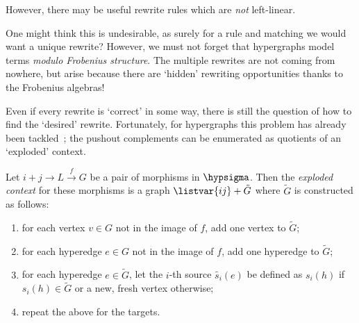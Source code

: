 \begin{example}
\end{example}

However, there may be useful rewrite rules which are \emph{not} left-linear.

\begin{example}
\end{example}

One might think this is undesirable, as surely for a rule and matching we would
want a unique rewrite?
However, we must not forget that hypergraphs model terms
\emph{modulo Frobenius structure}.
The multiple rewrites are not coming from nowhere, but arise because there are
`hidden' rewriting opportunities thanks to the Frobenius algebras!

\begin{example}
\end{example}

Even if every rewrite is `correct' in some way, there is still the question of
how to find the `desired' rewrite.
Fortunately, for hypergraphs this problem has already been
tackled~\cite{heumuller2011construction}; the pushout complements can be
enumerated as quotients of an `exploded' context.

\begin{definition}
    Let \(i+j \to L \xrightarrow{f} G\) be a pair of morphisms in
    \(\hypsigma\).
    Then the \emph{exploded context} for these morphisms is a graph
    \(\listvar{ij} + \tilde{G}\) where \(\tilde{G}\) is constructed as follows:
    \begin{enumerate}
        \item for each vertex \(v \in G\) not in the image of \(f\), add one
              vertex to \(\tilde{G}\);
        \item for each hyperedge \(e \in G\) not in the image of \(f\), add one
              hyperedge to \(\tilde{G}\);
        \item for each hyperedge \(e \in \tilde{G}\), let the \(i\)-th source
              \(\tilde{s_i}(e)\) be defined as \(s_i(h)\) if
              \(s_i(h) \in \tilde{G}\) or a new, fresh vertex otherwise;
        \item repeat the above for the targets.
    \end{enumerate}
\end{definition}


